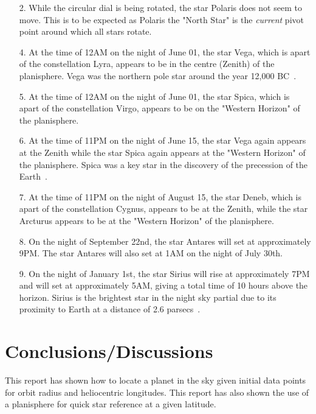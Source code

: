\documentclass{article}
\begin{document}
\begin{enumerate}
\item[2.] While the circular dial is being rotated, the star Polaris does not seem to move. This is to be expected as
Polaris the "North Star" is the \textit{current} pivot point around which all stars rotate.
\item[4.] At the time of 12AM on the night of June 01, the star Vega, which is apart of the constellation Lyra, appears to 
be in the centre (Zenith) of the planisphere. Vega was the northern pole star around the year 12,000 BC~\cite{Stell:2009}.
\item[5.] At the time of 12AM on the night of June 01, the star Spica, which is apart of the constellation Virgo, appears
to be on the "Western Horizon" of the planisphere.
\item[6.] At the time of 11PM on the night of June 15, the star Vega again appears at the Zenith while the star Spica
again appears at the "Western Horizon" of the planisphere. Spica was a key star in the discovery of the precession
of the Earth~\cite{Rufus:1943}.
\item[7.] At the time of 11PM on the night of August 15, the star Deneb, which is apart of the constellation Cygnus, appears
to be at the Zenith, while the star Arcturus appears to be at the "Western Horizon" of the planisphere.
\item[8.] On the night of September 22nd, the star Antares will set at approximately 9PM. The star Antares will also
set at 1AM on the night of July 30th.
\item[9.] On the night of January 1st, the star Sirius will rise at approximately 7PM and will set at approximately 5AM, 
giving a total time of 10 hours above the horizon. Sirius is the brightest star in the night sky partial due to its proximity
to Earth at a distance of 2.6 parsecs~\cite{van:2007}.
\end{enumerate}


\section{Conclusions/Discussions}

This report has shown how to locate a planet in the sky given initial data points for orbit radius and heliocentric 
longitudes. This report has also shown the use of a planisphere for quick star reference at a given latitude.
\end{document}
